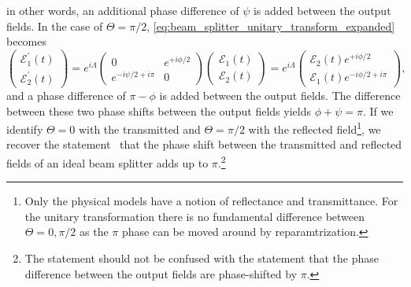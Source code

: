 in other words, an additional phase difference of $\psi$ is added between the output fields.
In the case of $\Theta=\pi/2$, \cref{eq:beam_splitter_unitary_transform_expanded} becomes
\begin{equation}
    \begin{pmatrix}
        \mathcal{E}_1^\prime(t)
        \\
        \mathcal{E}_2^\prime(t)
    \end{pmatrix}
    =
    e^{i\Lambda}
    \begin{pmatrix}
        0 & e^{+i\phi/2}
        \\
        e^{-i\psi/2+i\pi} & 0
    \end{pmatrix}
    \begin{pmatrix}
        \mathcal{E}_1(t)
        \\
        \mathcal{E}_2(t)
    \end{pmatrix}
    =
    e^{i\Lambda}
    \begin{pmatrix}
        \mathcal{E}_2(t)e^{+i\phi/2}
        \\
        \mathcal{E}_1(t)e^{-i\phi/2+i\pi}
    \end{pmatrix}
    \label{eq:beam_splitter_unitary_transform_reflection},
\end{equation}
and a phase difference of $\pi-\phi$ is added between the output fields.
The difference between these two phase shifts between the output fields yields $\phi+\psi=\pi$.
If we identify $\Theta=0$ with the transmitted and $\Theta=\pi/2$ with the reflected field\footnote{Only the physical models have a notion of reflectance and transmittance. For the unitary transformation there is no fundamental difference between $\Theta=0,\pi/2$ as the $\pi$ phase can be moved around by reparamtrization.}, we recover the statement~\cite{Zeilinger1981} that the phase shift between the transmitted and reflected fields of an ideal beam splitter adds up to $\pi$.\footnote{The statement should not be confused with the statement that the phase difference between the output fields are phase-shifted by $\pi$.}

